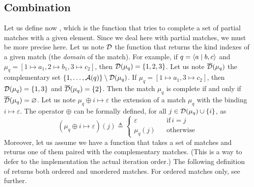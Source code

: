 \subsection{Combination}

Let us define now , which is the function that tries to
complete a set of partial matches with a given element. Since we deal
here with partial matches, we must be more precise here. Let us note
\(\cal D\) the function that returns the kind indexes of a given match
(the \emph{domain} of the match). For example, if \(q =
\langle a \mid b,c\rangle\) and \(\mu_q = [1 \mapsto a_1, 2 \mapsto b_1, 3
  \mapsto c_2]\), then \({\cal D}(\mu_q) = \{1,2,3\}\). Let us note
\(\overline{\cal D}(\mu_q)\) the complementary set \(\{1, \dots, {\cal
  A}(q)\} \setminus {\cal D}(\mu_q)\). If \(\mu_q = [1 \mapsto a_1, 3
  \mapsto c_2]\), then \({\cal D}(\mu_q) = \{1,3\}\) and
\(\overline{\cal D}(\mu_q) = \{2\}\). Then the match \(\mu_q\) is
complete if and only if \(\overline{\cal D}(\mu_q) =
\varnothing\). Let us note \(\mu_q \oplus i \mapsto \varepsilon\) the
extension of a match \(\mu_q\) with the binding \(i \mapsto
\varepsilon\). The operator \(\oplus\) can be formally defined, for
all \(j \in {\cal D}(\mu_q) \cup \{i\}\), as
\[
(\mu_q \oplus i \mapsto \varepsilon)(j) \triangleq
\left\{
\begin{aligned}
\varepsilon && \text{if} \, i = j\\
\mu_q(j)    && \text{otherwise}
\end{aligned}
\right.
\]
Moreover, let us assume we have a function  that takes a
set of matches and returns one of them paired with the complementary
matches. (This is a way to defer to the implementation the actual
iteration order.) The following definition of  returns
both ordered and unordered matches. For ordered matches only, see
further.
